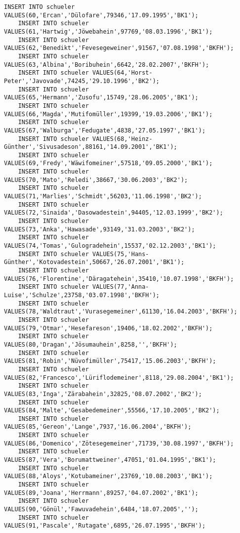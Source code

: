 \begin{lstlisting}[breaklines=True, numbers=none, basicstyle=\tiny, keepspaces=false]
	INSERT INTO schueler VALUES(60,'Ercan','Dülofare',79346,'17.09.1995','BK1');
	INSERT INTO schueler VALUES(61,'Hartwig','Jöwebahein',97769,'08.03.1996','BK1');
	INSERT INTO schueler VALUES(62,'Benedikt','Fevesegeweiner',91567,'07.08.1998','BKFH');
	INSERT INTO schueler VALUES(63,'Albina','Boribuhein',6642,'28.02.2007','BKFH');
	INSERT INTO schueler VALUES(64,'Horst-Peter','Javovade',74245,'29.10.1996','BK2');
	INSERT INTO schueler VALUES(65,'Hermann','Zusofu',15749,'28.06.2005','BK1');
	INSERT INTO schueler VALUES(66,'Magda','Mutifomüller',19399,'19.03.2006','BK1');
	INSERT INTO schueler VALUES(67,'Walburga','Fedugate',4838,'27.05.1997','BK1');
	INSERT INTO schueler VALUES(68,'Heinz-Günther','Sivusadeson',88161,'14.09.2001','BK1');
	INSERT INTO schueler VALUES(69,'Fredy','Wäwifomeiner',57518,'09.05.2000','BK1');
	INSERT INTO schueler VALUES(70,'Mato','Reledi',38667,'30.06.2003','BK2');
	INSERT INTO schueler VALUES(71,'Marlies','Schmidt',56203,'11.06.1998','BK2');
	INSERT INTO schueler VALUES(72,'Sinaida','Dasowadestein',94405,'12.03.1999','BK2');
	INSERT INTO schueler VALUES(73,'Anka','Hawasade',93149,'31.03.2003','BK2');
	INSERT INTO schueler VALUES(74,'Tomas','Gulogradehein',15537,'02.12.2003','BK1');
	INSERT INTO schueler VALUES(75,'Hans-Günther','Kotovadestein',50667,'26.07.2001','BK1');
	INSERT INTO schueler VALUES(76,'Florentine','Däragatehein',35410,'10.07.1998','BKFH');
	INSERT INTO schueler VALUES(77,'Anna-Luise','Schulze',23758,'03.07.1998','BKFH');
	INSERT INTO schueler VALUES(78,'Waldtraut','Vurasegemeiner',61130,'16.04.2003','BKFH');
	INSERT INTO schueler VALUES(79,'Otmar','Hesefareson',19406,'18.02.2002','BKFH');
	INSERT INTO schueler VALUES(80,'Dragan','Jösumauhein',8258,'','BKFH');
	INSERT INTO schueler VALUES(81,'Robin','Nüvofimüller',75417,'15.06.2003','BKFH');
	INSERT INTO schueler VALUES(82,'Francesco','Lüriflodemeiner',8118,'29.08.2004','BK1');
	INSERT INTO schueler VALUES(83,'Inga','Zärabahein',32825,'08.07.2002','BK2');
	INSERT INTO schueler VALUES(84,'Malte','Gesabedemeiner',55566,'17.10.2005','BK2');
	INSERT INTO schueler VALUES(85,'Gereon','Lange',7937,'16.06.2004','BKFH');
	INSERT INTO schueler VALUES(86,'Domenico','Zötesegemeiner',71739,'30.08.1997','BKFH');
	INSERT INTO schueler VALUES(87,'Vera','Borumattweiner',47051,'01.04.1995','BK1');
	INSERT INTO schueler VALUES(88,'Aloys','Kotubameiner',23769,'10.08.2003','BK1');
	INSERT INTO schueler VALUES(89,'Joana','Herrmann',89257,'04.07.2002','BK1');
	INSERT INTO schueler VALUES(90,'Gönül','Fawuvadehein',6484,'18.07.2005','');
	INSERT INTO schueler VALUES(91,'Pascale','Rutagate',6895,'26.07.1995','BKFH');

\end{lstlisting}
